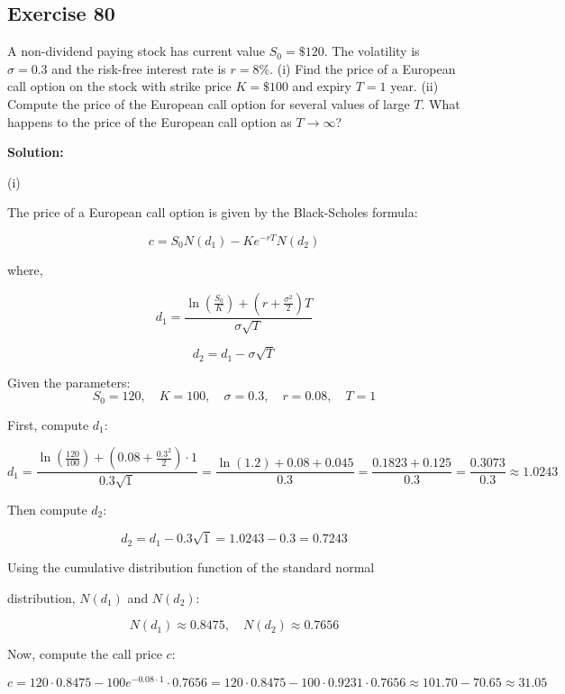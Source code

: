 \documentclass{article}
\begin{document}
\subsection*{Exercise 80}

A non-dividend paying stock has current value \( S_0 = \$120 \). The volatility is \( \sigma = 0.3 \) and the risk-free interest rate is \( r = 8\% \). (i) Find the price of a European call option on the stock with strike price \( K = \$100 \) and expiry \( T = 1 \) year. (ii) Compute the price of the European call option for several values of large \( T \). What happens to the price of the European call option as \( T \to \infty \)?

\vspace{\baselineskip}

\textbf{Solution:}

\vspace{\baselineskip}

(i)

The price of a European call option is given by the Black-Scholes formula:

\[
c = S_0 N(d_1) - Ke^{-rT} N(d_2)
\]

where,

\[
d_1 = \frac{\ln\left(\frac{S_0}{K}\right) + \left(r + \frac{\sigma^2}{2}\right)T}{\sigma \sqrt{T}}
\]

\[
d_2 = d_1 - \sigma \sqrt{T}
\]

Given the parameters:
\[
S_0 = 120, \quad K = 100, \quad \sigma = 0.3, \quad r = 0.08, \quad T = 1
\]

First, compute \( d_1 \):

\[
d_1 = \frac{\ln\left(\frac{120}{100}\right) + \left(0.08 + \frac{0.3^2}{2}\right) \cdot 1}{0.3 \sqrt{1}} = \frac{\ln(1.2) + 0.08 + 0.045}{0.3} = \frac{0.1823 + 0.125}{0.3} = \frac{0.3073}{0.3} \approx 1.0243
\]

Then compute \( d_2 \):

\[
d_2 = d_1 - 0.3 \sqrt{1} = 1.0243 - 0.3 = 0.7243
\]

Using the cumulative distribution function of the standard normal 

distribution, \( N(d_1) \) and \( N(d_2) \):

\[
N(d_1) \approx 0.8475, \quad N(d_2) \approx 0.7656
\]

Now, compute the call price \( c \):

\[
c = 120 \cdot 0.8475 - 100 e^{-0.08 \cdot 1} \cdot 0.7656 = 120 \cdot 0.8475 - 100 \cdot 0.9231 \cdot 0.7656 \approx 101.70 - 70.65 \approx 31.05
\]
\end{document}
